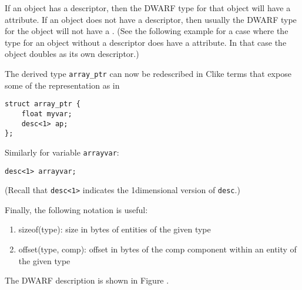 If an object has a descriptor, then the DWARF type for that
object will have a 
\DWATdatalocation{} 
attribute. If an object
does not have a descriptor, then usually the DWARF type for the
object will not have a 
\DWATdatalocation. 
(See the following
 example for a case where the type for an object without
a descriptor does have a 
\DWATdatalocation{} attribute. In
that case the object doubles as its own descriptor.)

The  derived type \texttt{array\_ptr} can now be redescribed
in C\dash like terms that expose some of the representation as in

\begin{lstlisting}[numbers=none]
struct array_ptr {
    float myvar;
    desc<1> ap;
};
\end{lstlisting}

Similarly for variable \texttt{arrayvar}:
\begin{lstlisting}[numbers=none]
desc<1> arrayvar;
\end{lstlisting}

(Recall that \texttt{desc\textless 1\textgreater} 
indicates the 1\dash dimensional version of \texttt{desc}.)

\newpage
Finally, the following notation is useful:
\begin{enumerate}[1. ]
\item  sizeof(type): size in bytes of entities of the given type
\item offset(type, comp): offset in bytes of the comp component
within an entity of the given type
\end{enumerate}

The DWARF description is shown 
in Figure .

